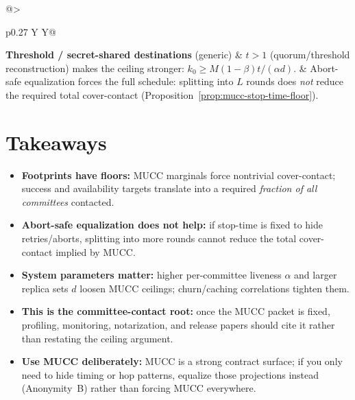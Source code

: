\documentclass[11pt]{article}
\begin{document}
\begin{table}[t]
\begin{tabularx}{\linewidth}{@{}>{\raggedright\arraybackslash}p{0.27\linewidth} Y Y@{}}
\textbf{Threshold / secret-shared destinations} (generic)
& $t>1$ (quorum/threshold reconstruction) makes the ceiling stronger: $k_0\ge M(1-\beta)t/(\alpha d)$.
& Abort-safe equalization forces the full schedule: splitting into $L$ rounds does \emph{not} reduce the required total cover-contact (Proposition~\ref{prop:mucc-stop-time-floor}). \\
\bottomrule
\end{tabularx}
\caption{One-page mapping from common anonymous DHT/directory design patterns into the parameters of Theorem~\ref{thm:mucc-ceiling}.
The mapping is intentionally conservative and ignores correlations that would only worsen the ceiling.
}
\label{tab:protocol-mapping}
\end{table}





\section{Takeaways}
\begin{itemize}[leftmargin=*]
\item \textbf{Footprints have floors:} MUCC marginals force nontrivial cover-contact; success and availability targets translate into a required \emph{fraction of all committees} contacted.
\item \textbf{Abort-safe equalization does not help:} if stop-time is fixed to hide retries/aborts, splitting into more rounds cannot reduce the total cover-contact implied by MUCC.
\item \textbf{System parameters matter:} higher per-committee liveness $\alpha$ and larger replica sets $d$ loosen MUCC ceilings; churn/caching correlations tighten them.
\item \textbf{This is the committee-contact root:} once the MUCC packet is fixed, profiling, monitoring, notarization, and release papers should cite it rather than restating the ceiling argument.
\item \textbf{Use MUCC deliberately:} MUCC is a strong contract surface; if you only need to hide timing or hop patterns, equalize those projections instead (Anonymity~B) rather than forcing MUCC everywhere.
\end{itemize}
\end{document}
